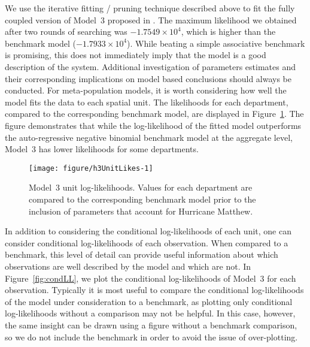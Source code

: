 We use the iterative fitting / pruning technique described above to fit the fully coupled version of Model~3 proposed in \cite{lee20}.
The maximum likelihood we obtained after two rounds of searching was $\ensuremath{-1.7549\times 10^{4}}$, which is higher than the benchmark model ($\ensuremath{-1.7933\times 10^{4}}$).
While beating a simple associative benchmark is promising, this does not immediately imply that the model is a good description of the system.
Additional investigation of parameters estimates and their corresponding implications on model based conclusions should always be conducted.
For meta-population models, it is worth considering how well the model fits the data to each spatial unit.
The likelihoods for each department, compared to the corresponding benchmark model, are displayed in Figure~\ref{fig:h3UnitLikes}.
The figure demonstrates that while the log-likelihood of the fitted model outperforms the auto-regressive negative binomial benchmark model at the aggregate level, Model~3 has lower likelihoods for some departments.

\begin{figure}[!ht]
\begin{knitrout}
\color{fgcolor}

{\centering \texttt{[image: figure/h3UnitLikes-1]} 

}


\end{knitrout}
\caption[Model~3 unit log-likelihoods.]{\label{fig:h3UnitLikes}Model~3 unit log-likelihoods. Values for each department are compared to the corresponding benchmark model prior to the inclusion of parameters that account for Hurricane Matthew.}
\end{figure}

In addition to considering the conditional log-likelihoods of each unit, one can consider conditional log-likelihoods of each observation.
When compared to a benchmark, this level of detail can provide useful information about which observations are well described by the model and which are not.
In Figure~\ref{fig:condLL}, we plot the conditional log-likelihoods of Model~3 for each observation.
Typically it is most useful to compare the conditional log-likelihoods of the model under consideration to a benchmark, as plotting only conditional log-likelihoods without a comparison may not be helpful.
In this case, however, the same insight can be drawn using a figure without a benchmark comparison, so we do not include the benchmark in order to avoid the issue of over-plotting.

